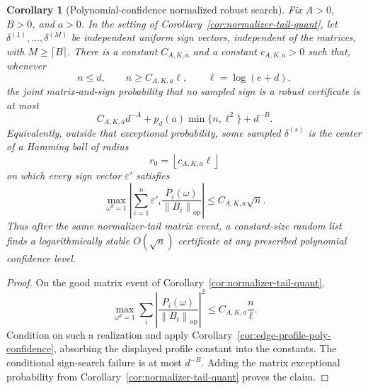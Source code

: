 \documentclass[11pt]{amsart}
\numberwithin{equation}{section}
\newtheorem{corollary}[theorem]{Corollary}
\theoremstyle{definition}
\theoremstyle{remark}
\newcommand{\op}{\mathrm{op}}
\newcommand{\norm}[1]{\left\lVert #1\right\rVert}
\newcommand{\eps}{\varepsilon}
\begin{document}
\begin{corollary}[Polynomial-confidence normalized robust search]
\label{cor:normalizer-tail-poly-confidence}
Fix \(A>0\), \(B>0\), and \(a>0\).  In the setting of
Corollary~\ref{cor:normalizer-tail-quant}, let
\(\delta^{(1)},\ldots,\delta^{(M)}\) be independent uniform sign vectors,
independent of the matrices, with \(M\ge\lceil B\rceil\).  There is a constant
\(C_{A,K,a}\) and a constant \(c_{A,K,a}>0\) such that, whenever
\[
  n\le d,\qquad n\ge C_{A,K,a}\ell,\qquad \ell=\log(e+d),
\]
the joint matrix-and-sign probability that no sampled sign is a robust
certificate is at most
\[
  C_{A,K,a}d^{-A}+p_d(a)\min\{n,\ell^2\}+d^{-B}.
\]
Equivalently, outside that exceptional probability, some sampled
\(\delta^{(s)}\) is the center of a Hamming ball of radius
\[
  r_0=\left\lfloor c_{A,K,a}\ell\right\rfloor
\]
on which every sign vector \(\eps'\) satisfies
\[
  \max_{\omega^d=1}\left|\sum_{i=1}^n
  \eps'_i\frac{P_i(\omega)}{\norm{B_i}_{\op}}\right|
  \le C_{A,K,a}\sqrt n .
\]
Thus after the same normalizer-tail matrix event, a constant-size random list
finds a logarithmically stable \(O(\sqrt n)\) certificate at any prescribed
polynomial confidence level.
\end{corollary}

\begin{proof}
On the good matrix event of Corollary~\ref{cor:normalizer-tail-quant},
\[
  \max_{\omega^d=1}\sum_i
  \left|\frac{P_i(\omega)}{\norm{B_i}_{\op}}\right|^2
  \le C_{A,K,a}\frac n\ell .
\]
Condition on such a realization and apply
Corollary~\ref{cor:edge-profile-poly-confidence}, absorbing the displayed
profile constant into the constants.  The conditional sign-search failure is at
most \(d^{-B}\).  Adding the matrix exceptional probability from
Corollary~\ref{cor:normalizer-tail-quant} proves the claim.
\end{proof}
\end{document}
